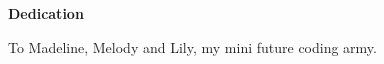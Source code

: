 \newpage
{}
\begin{center}
\textbf{Dedication}

\vspace{0.2in}
To Madeline, Melody and Lily, my mini future coding army.
\end{center}
